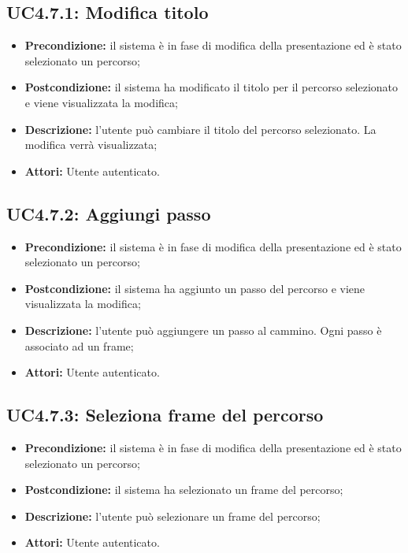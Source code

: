\subsection{ UC4.7.1: Modifica titolo }

\begin{itemize}
	\item \textbf{Precondizione:} il sistema è in fase di modifica della presentazione ed è stato selezionato un percorso;
	\item \textbf{Postcondizione:} il sistema ha modificato il titolo per il percorso selezionato e viene visualizzata la modifica;
	\item \textbf{Descrizione:} l'utente può cambiare il titolo del percorso selezionato. La modifica verrà visualizzata;
	\item \textbf{Attori:} Utente autenticato.
\end{itemize}
\subsection{ UC4.7.2: Aggiungi passo}

\begin{itemize}
	\item \textbf{Precondizione:} il sistema è in fase di modifica della presentazione ed è stato selezionato un percorso;
	\item \textbf{Postcondizione:} il sistema ha aggiunto un passo del percorso e viene visualizzata la modifica;
	\item \textbf{Descrizione:} l'utente può aggiungere un passo al cammino. Ogni passo è associato ad un frame;
	\item \textbf{Attori:} Utente autenticato.
\end{itemize}
\subsection{ UC4.7.3: Seleziona frame del percorso}

\begin{itemize}
	\item \textbf{Precondizione:} il sistema è in fase di modifica della presentazione ed è stato selezionato un percorso;
	\item \textbf{Postcondizione:} il sistema ha selezionato un frame del percorso;
	\item \textbf{Descrizione:} l'utente può selezionare un frame del percorso;
	\item \textbf{Attori:} Utente autenticato.
\end{itemize}

